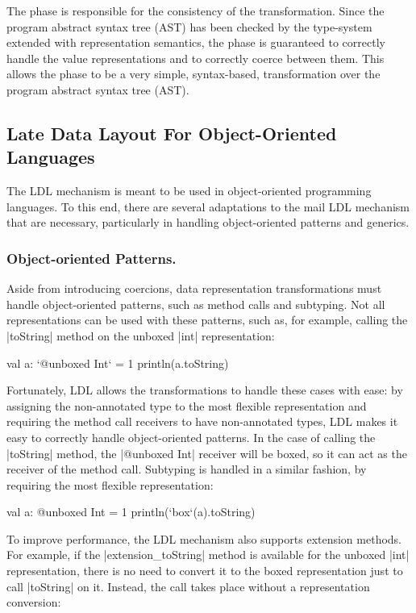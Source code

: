 The \commit{} phase is responsible for the consistency of the transformation. Since the program abstract syntax tree (AST) has been checked by the type-system extended with representation semantics, the \commit{} phase is guaranteed to correctly handle the value representations and to correctly coerce between them. This allows the \commit{} phase to be a very simple, syntax-based, transformation over the program abstract syntax tree (AST).

\subsection{Late Data Layout For Object-Oriented Languages}

The LDL mechanism is meant to be used in object-oriented programming languages. To this end, there are several adaptations to the mail LDL mechanism that are necessary, particularly in handling object-oriented patterns and generics.

\subsubsection{Object-oriented Patterns.} Aside from introducing coercions, data representation transformations must handle object-oriented patterns, such as method calls and subtyping. Not all representations can be used with these patterns, such as, for example, calling the |toString| method on the unboxed |int| representation:

\begin{lstlisting-nobreak}
val a: `@unboxed Int` = 1
println(a.toString)
\end{lstlisting-nobreak}

Fortunately, LDL allows the transformations to handle these cases with ease: by assigning the non-annotated type to the most flexible representation and requiring the method call receivers to have non-annotated types, LDL makes it easy to correctly handle object-oriented patterns. In the case of calling the |toString| method, the |@unboxed Int| receiver will be boxed, so it can act as the receiver of the method call. Subtyping is handled in a similar fashion, by requiring the most flexible representation:

\begin{lstlisting-nobreak}
val a: @unboxed Int = 1
println(`box`(a).toString)
\end{lstlisting-nobreak}

To improve performance, the LDL mechanism also supports extension methods. For example, if the |extension_toString| method is available for the unboxed |int| representation, there is no need to convert it to the boxed representation just to call |toString| on it. Instead, the call takes place without a representation conversion:

